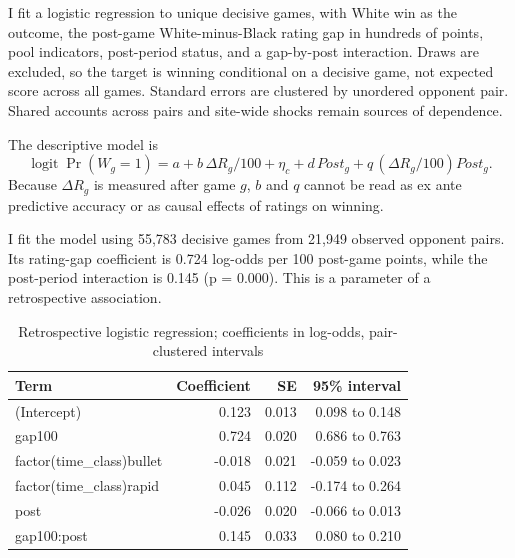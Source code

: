 \documentclass[11pt,a4paper]{article}
\begin{document}
I fit a logistic regression to unique decisive games, with White win as the outcome, the post-game White-minus-Black rating gap in hundreds of points, pool indicators, post-period status, and a gap-by-post interaction. Draws are excluded, so the target is winning conditional on a decisive game, not expected score across all games. Standard errors are clustered by unordered opponent pair. Shared accounts across pairs and site-wide shocks remain sources of dependence.

The descriptive model is
\begin{equation}
\operatorname{logit}\Pr(W_g=1)=a+b\,\Delta R_g/100+\eta_c+d\,Post_g+q\,(\Delta R_g/100)Post_g.
\end{equation}
Because $\Delta R_g$ is measured after game $g$, $b$ and $q$ cannot be read as ex ante predictive accuracy or as causal effects of ratings on winning.

I fit the model using 55,783 decisive games from 21,949 observed opponent pairs. Its rating-gap coefficient is 0.724 log-odds per 100 post-game points, while the post-period interaction is 0.145 (p = 0.000). This is a parameter of a retrospective association.

\begin{table}[H]\centering\small\caption{Retrospective logistic regression; coefficients in log-odds, pair-clustered intervals}\begin{tabular}{p{5.5cm}rrr}\toprule

Term & Coefficient & SE & 95\% interval \\ \midrule

(Intercept) & 0.123 & 0.013 & 0.098 to 0.148 \\

gap100 & 0.724 & 0.020 & 0.686 to 0.763 \\

factor(time\_class)bullet & -0.018 & 0.021 & -0.059 to 0.023 \\

factor(time\_class)rapid & 0.045 & 0.112 & -0.174 to 0.264 \\

post & -0.026 & 0.020 & -0.066 to 0.013 \\

gap100:post & 0.145 & 0.033 & 0.080 to 0.210 \\

\bottomrule\end{tabular}\end{table}
\end{document}
